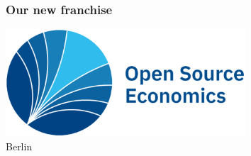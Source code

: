 \begin{frame}[standout]\frametitle{Our new franchise}\vspace{1cm}

\hspace{3cm}\includegraphics[height=4cm]{material/crop-ose-logo.pdf}\\[-1cm]
\hspace{7.45cm}\textcolor{OSEBlue}{\fontsize{23pt}{20pt}\selectfont Berlin}

\end{frame}
